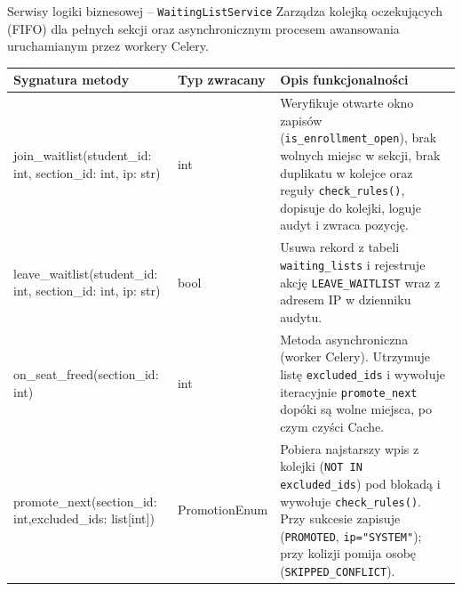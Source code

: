 \documentclass[aspectratio=169, 10pt, xcolor=table]{beamer}
\renewcommand{\arraystretch}{1.18}
\begin{document}
\begin{frame}{Serwisy logiki biznesowej -- \texttt{WaitingListService}}
    \scriptsize
    \renewcommand{\arraystretch}{1.15}
    Zarządza kolejką oczekujących (FIFO) dla pełnych sekcji oraz asynchronicznym procesem awansowania uruchamianym przez workery Celery.
    \vspace{3pt}

    \begin{tabularx}{\textwidth}{@{} M{0.36\textwidth} T{0.15\textwidth} Y @{}}
        \toprule
        \textbf{\textsf{\textcolor{NavyPrimary}{Sygnatura metody}}} & \textbf{\textsf{\textcolor{NavyPrimary}{Typ zwracany}}} & \textbf{\textcolor{NavyPrimary}{Opis funkcjonalności}} \\
        \midrule
        join\_waitlist(student\_id: int, section\_id: int, ip: str) & int & Weryfikuje otwarte okno zapisów (\texttt{is\_enrollment\_open}), brak wolnych miejsc w sekcji, brak duplikatu w kolejce oraz reguły \texttt{check\_rules()}, dopisuje do kolejki, loguje audyt i zwraca pozycję. \\
        leave\_waitlist(student\_id: int, section\_id: int, ip: str) & bool & Usuwa rekord z tabeli \texttt{waiting\_lists} i rejestruje akcję \texttt{LEAVE\_WAITLIST} wraz z adresem IP w dzienniku audytu. \\
        on\_seat\_freed(section\_id: int) & int & Metoda asynchroniczna (worker Celery). Utrzymuje listę \texttt{excluded\_ids} i wywołuje iteracyjnie \texttt{promote\_next} dopóki są wolne miejsca, po czym czyści Cache. \\
        promote\_next(section\_id: int,\newline excluded\_ids: list[int]) & PromotionEnum & Pobiera najstarszy wpis z kolejki (\texttt{NOT IN excluded\_ids}) pod blokadą i wywołuje \texttt{check\_rules()}. Przy sukcesie zapisuje (\texttt{PROMOTED}, \texttt{ip="SYSTEM"}); przy kolizji pomija osobę (\texttt{SKIPPED\_CONFLICT}). \\
        \bottomrule
    \end{tabularx}
\end{frame}
\end{document}

